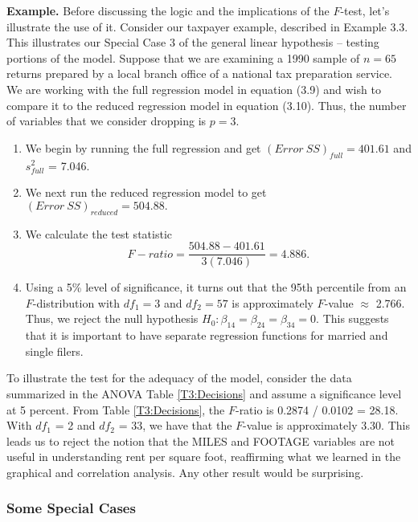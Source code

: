 \linejed

\textbf{Example.} Before discussing the logic and the implications
of the $F$-test, let's illustrate the use of it. Consider our
taxpayer example, described in Example 3.3. This illustrates our
Special Case 3 of the general linear hypothesis -- testing portions
of the model. Suppose that we are examining a 1990 sample of $n=65$
returns prepared by a local branch office of a national tax
preparation service. We are working with the full regression model
in equation (3.9) and wish to compare it to the reduced regression
model in equation (3.10). Thus, the number of variables that we
consider dropping is $p=3$.

\begin{enumerate}
\item We begin by running the full regression and get $%
(Error~SS)_{full}=401.61$ and $s_{full}^{2}$ = 7.046.

\item We next run the reduced regression model to get $%
(Error~SS)_{reduced}=504.88.$

\item We calculate the test statistic
\begin{equation*}
F-ratio=\frac{504.88-401.61}{3(7.046)}=4.886.
\end{equation*}

\item Using a 5\% level of significance, it turns out that the 95th
percentile from an $F$-distribution with $df_1=3$ and $df_2=57$ is
approximately $F$-value $\approx $ 2.766. Thus, we reject the null
hypothesis $H_0:\beta_{14}=\beta_{24}=\beta_{34}=0$. This suggests
that it is important to have separate regression functions for
married and single filers.
\end{enumerate}

To illustrate the test for the adequacy of the model, consider the
data summarized in the ANOVA Table \ref{T3:Decisions} and assume a
significance level at 5 percent. From Table \ref{T3:Decisions}, the
$F$-ratio is 0.2874 / 0.0102 = 28.18. With $df_1$ = 2 and $df_2$ =
33, we have that the $F$-value is approximately 3.30. This leads us
to reject the notion that the MILES and FOOTAGE variables are not
useful in understanding rent per square foot, reaffirming what we
learned in the graphical and correlation analysis. Any other result
would be surprising.

\linejed

\subsubsection*{Some Special Cases}

